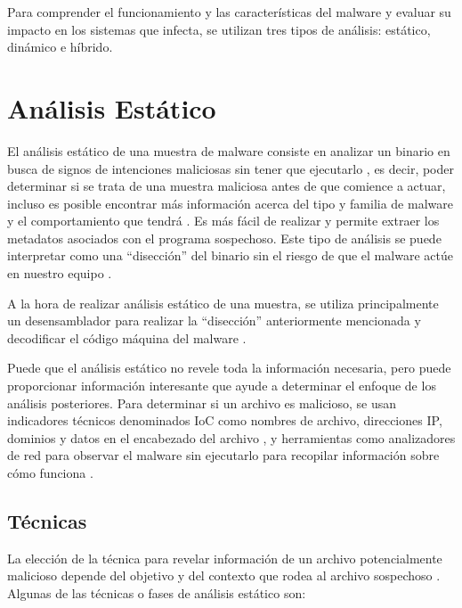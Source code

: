 Para comprender el funcionamiento y las características del malware y evaluar su impacto en los sistemas que infecta, se utilizan tres tipos de análisis: estático, dinámico e híbrido. 





\section{Análisis Estático}
\label{sec:aestatico}

\noindent El análisis estático de una muestra de malware consiste en analizar un binario en busca de signos de intenciones maliciosas sin tener que ejecutarlo \cite{111}, es decir, poder determinar si se trata de una muestra maliciosa antes de que comience a actuar, incluso es posible encontrar más información acerca del tipo y familia de malware y el comportamiento que tendrá \cite{Mohanta2020}. Es más fácil de realizar y permite extraer los metadatos asociados con el programa sospechoso.
Este tipo de análisis se puede interpretar como una ``disección'' del binario sin el riesgo de que el malware actúe en nuestro equipo \cite{EPN2014}.

A la hora de realizar análisis estático de una muestra, se utiliza principalmente un desensamblador para realizar la “disección” anteriormente mencionada y decodificar el código máquina del malware \cite{SIM2020}.

Puede que el análisis estático no revele toda la información necesaria, pero puede proporcionar información interesante que ayude a determinar el enfoque de los análisis posteriores. Para determinar si un archivo es malicioso, se usan indicadores técnicos denominados \gls{IoC} como nombres de archivo, direcciones \gls{IP}, dominios y datos en el encabezado del archivo \cite{90}, y herramientas como analizadores de red para observar el malware sin ejecutarlo para recopilar información sobre cómo funciona \cite{113}. 


\subsection{Técnicas}

\noindent La elección de la técnica para revelar información de un archivo potencialmente malicioso depende del objetivo y del contexto que rodea al archivo sospechoso \cite{89}. Algunas de las técnicas o fases de análisis estático son:

